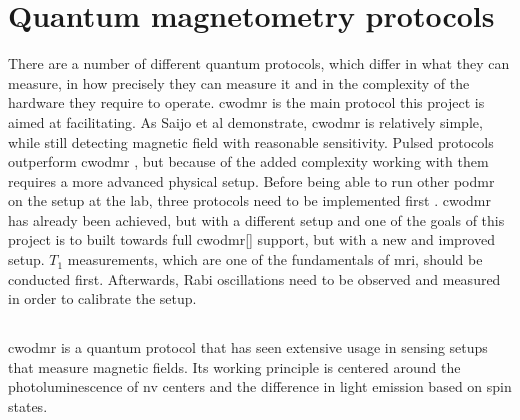 \section{Quantum magnetometry protocols}\label{chap:intro:sequences}
There are a number of different quantum protocols, which differ in what they can measure, in how precisely they can measure it and in the complexity of the hardware they require to operate. \gls{cwodmr} is the main protocol this project is aimed at facilitating. As Saijo et al \cite{saijo2018ac} demonstrate, \gls{cwodmr} is relatively simple, while still detecting magnetic field with reasonable sensitivity. Pulsed protocols outperform \gls{cwodmr} \cite{zhang2020high}, but because of the added complexity working with them requires a more advanced physical setup. Before being able to run other \gls{podmr} on the setup at the lab, three protocols need to be implemented first \cite{sewani2020coherent}. \gls{cwodmr} has already been achieved, but with a different setup and one of the goals of this project is to built towards full \gls{cwodmr}[] support, but with a new and improved setup. $T_1$ measurements, which are one of the fundamentals of \gls{mri}, should be conducted first. Afterwards, Rabi oscillations need to be observed and measured in order to calibrate the setup.



\subsection{}\label{chap:intro:cwodmr}
\gls{cwodmr} is a quantum protocol that has seen extensive usage in sensing setups that measure magnetic fields. Its working principle is centered around the photoluminescence of \gls{nv} centers and the difference in light emission based on spin states.

